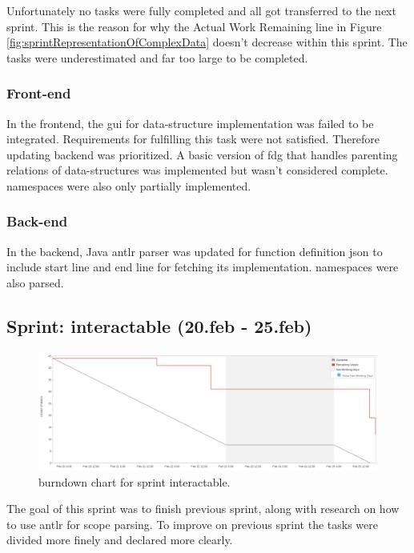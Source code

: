 Unfortunately no tasks were fully completed and all got transferred to the next \gls{sprint}. This is the reason for why the Actual Work Remaining line in Figure \ref{fig:sprintRepresentationOfComplexData} doesn't decrease within this \gls{sprint}. The tasks were underestimated and far too large to be completed.

\subsubsection{Front-end}
In the \gls{frontend}, the \gls{gui} for data-structure implementation was failed to be integrated. Requirements for fulfilling this task were not satisfied. Therefore updating \gls{backend} was prioritized.
A basic version of \gls{fdg} that handles parenting relations of data-structures was implemented but wasn't considered complete. \Glspl{namespace} were also only partially implemented.

\subsubsection{Back-end}
In the \gls{backend}, Java \gls{antlr} parser was updated for function definition \gls{json} to include start line and end line for fetching its implementation. \Glspl{namespace} were also parsed.


\subsection{Sprint: interactable (20.feb - 25.feb)}
\begin{figure}[H] 
    \includegraphics[width=\textwidth]{inc/images/sprints/sprintInteractable200219-250219.png}
    \caption{\Gls{burndown} chart for \gls{sprint} interactable.}
    \label{fig:sprintInteractable}
\end{figure}
The goal of this \gls{sprint} was to finish previous sprint, along with research on how to use \gls{antlr} for scope parsing. To improve on previous \gls{sprint} the tasks were divided more finely and declared more clearly.

